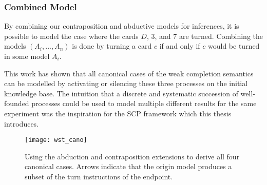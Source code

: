  
\subsubsection*{Combined Model}
By combining our contraposition and abductive models for inferences, it is possible to model the case where the cards $D$, $3$, and $7$ are turned. Combining the models $(A_i,...,A_n)$ is done by turning a card $c$ if and only if $c$ would be turned in some model $A_i$.

This work has shown that all canonical cases of the weak completion semantics can be modelled by activating or silencing these three processes on the initial knowledge base. The intuition that a discrete and systematic succession of well-founded processes could be used to model multiple different results for the same experiment was the inspiration for the SCP framework which this thesis introduces.


\begin{figure}
\centering \texttt{[image: wst\_cano]}
\caption{Using the abduction and contraposition extensions to derive all four canonical cases. Arrows indicate that the origin model produces a subset of the turn instructions of the endpoint.}
\label{fig:wstcano}
\end{figure}




















